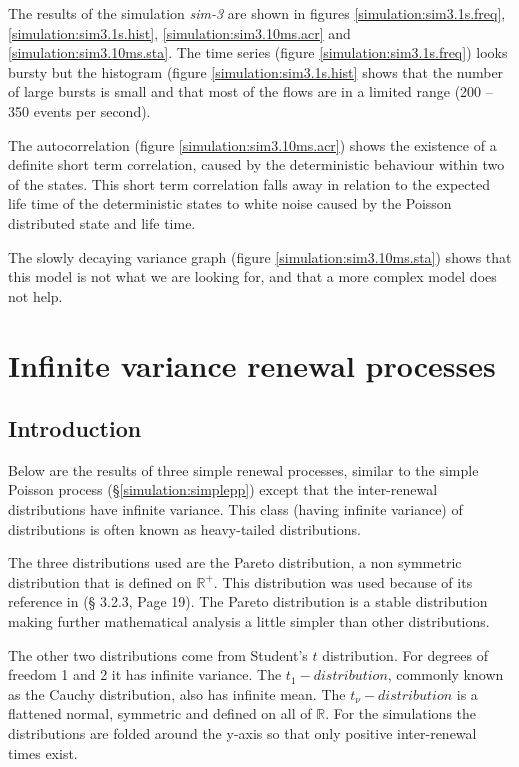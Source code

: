 The results of the simulation \emph{sim-3} are shown in figures
\ref{simulation:sim3.1s.freq}, \ref{simulation:sim3.1s.hist},
\ref{simulation:sim3.10ms.acr} and \ref{simulation:sim3.10ms.sta}.
The time series (figure \ref{simulation:sim3.1s.freq}) looks bursty
but the histogram (figure \ref{simulation:sim3.1s.hist} shows that the
number of large bursts is small and that most of the flows are in a
limited range (200 -- 350 events per second).

The autocorrelation (figure \ref{simulation:sim3.10ms.acr}) shows the
existence of a definite short term correlation, caused by the
deterministic behaviour within two of the states.  This short term
correlation falls away in relation to the expected life time of the
deterministic states to white noise caused by the Poisson distributed
state and life time.

The slowly decaying variance graph (figure
\ref{simulation:sim3.10ms.sta}) shows that this model is not what we
are looking for, and that a more complex model does not help.

\clearpage

\section{Infinite variance renewal processes}

\subsection{Introduction}

Below are the results of three simple renewal processes, similar to
the simple Poisson process (\S \ref{simulation:simplepp}) except that
the inter-renewal distributions have infinite variance.  This class
(having infinite variance) of distributions is often known as
heavy-tailed distributions.

The three distributions used are the Pareto distribution, a non
symmetric distribution that is defined on ${\mathbb R}^+$.  This
distribution was used because of its reference in \cite{Bell:4} (\S
3.2.3, Page 19).  The Pareto distribution is a stable distribution
making further mathematical analysis a little simpler than other
distributions.

The other two distributions come from Student's $t$ distribution.  For
degrees of freedom 1 and 2 it has infinite variance.  The
$t_1-distribution$, commonly known as the Cauchy distribution, also
has infinite mean.  The $t_\nu-distribution$ is a flattened normal,
symmetric and defined on all of ${\mathbb R}$.  For the simulations
the distributions are folded around the y-axis so that only positive
inter-renewal times exist.

